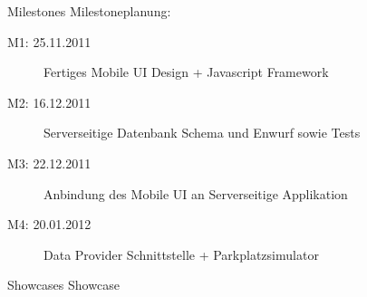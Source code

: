 \begin{frame}[t,fragile]{Milestones}
	Milestoneplanung:
	\begin{description}
		\item[M1: 25.11.2011] Fertiges Mobile UI Design + Javascript Framework
		\item[M2: 16.12.2011] Serverseitige Datenbank Schema und Enwurf sowie Tests
		\item[M3: 22.12.2011] Anbindung des Mobile UI an Serverseitige Applikation
		\item[M4: 20.01.2012] Data Provider Schnittstelle + Parkplatzsimulator
	\end{description}
\end{frame}


\begin{frame}[t,fragile]{Showcases}
	Showcase
\end{frame}


